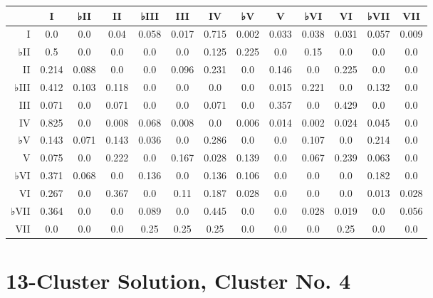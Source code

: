 \begin{table}[htbp]
\begin{minipage}{\linewidth}
\setlength{\tymax}{0.5\linewidth}
\centering
\small
\begin{tabulary}{\textwidth}{@{}RCCCCCCCCCCCC@{}} \toprule
&I&♭II&II&♭III&III&IV&♭V&V&♭VI&VI&♭VII&VII\\
\midrule
I&0.0&0.0&0.04&0.058&0.017&0.715&0.002&0.033&0.038&0.031&0.057&0.009\\
♭II&0.5&0.0&0.0&0.0&0.0&0.125&0.225&0.0&0.15&0.0&0.0&0.0\\
II&0.214&0.088&0.0&0.0&0.096&0.231&0.0&0.146&0.0&0.225&0.0&0.0\\
♭III&0.412&0.103&0.118&0.0&0.0&0.0&0.0&0.015&0.221&0.0&0.132&0.0\\
III&0.071&0.0&0.071&0.0&0.0&0.071&0.0&0.357&0.0&0.429&0.0&0.0\\
IV&0.825&0.0&0.008&0.068&0.008&0.0&0.006&0.014&0.002&0.024&0.045&0.0\\
♭V&0.143&0.071&0.143&0.036&0.0&0.286&0.0&0.0&0.107&0.0&0.214&0.0\\
V&0.075&0.0&0.222&0.0&0.167&0.028&0.139&0.0&0.067&0.239&0.063&0.0\\
♭VI&0.371&0.068&0.0&0.136&0.0&0.136&0.106&0.0&0.0&0.0&0.182&0.0\\
VI&0.267&0.0&0.367&0.0&0.11&0.187&0.028&0.0&0.0&0.0&0.013&0.028\\
♭VII&0.364&0.0&0.0&0.089&0.0&0.445&0.0&0.0&0.028&0.019&0.0&0.056\\
VII&0.0&0.0&0.0&0.25&0.25&0.25&0.0&0.0&0.0&0.25&0.0&0.0\\

\bottomrule

\end{tabulary}
\end{minipage}
\end{table}

\section{13-Cluster Solution, Cluster No. 4}
\label{13-clustersolutionclusterno.4}

